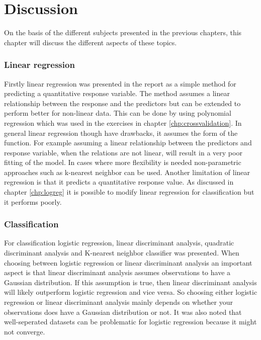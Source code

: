 \chapter{Discussion}
\label{chp:disc}
On the basis of the different subjects presented in the previous chapters, this chapter will discuss the different aspects of these  topics.

\subsection{Linear regression}

Firstly linear regression was presented in the report as a simple method for predicting a quantitative response variable. The method assumes a linear relationship between the response and the predictors but can be extended to perform better for non-linear data. This can be done by using polynomial regression which was used in the exercises in chapter \ref{chp:crossvalidation}. In general linear regression though have drawbacks, it assumes the form of the function. For example assuming a linear relationship between the predictors and response variable, when the relations are not linear, will result in a very poor fitting of the model. In cases where more flexibility is needed non-parametric approaches such as k-nearest neighbor can be used. Another limitation of linear regression is that it predicts a quantitative response value. As discussed in chapter \ref{chp:logreg} it is possible to modify linear regression for classification but it performs poorly.

\subsection{Classification}

For classification logistic regression, linear discriminant analysis, quadratic discriminant analysis and K-nearest neighbor classifier was presented. When choosing between logistic regression or linear discriminant analysis an important aspect is that linear discriminant analysis assumes observations to have a Gaussian distribution. If this assumption is true, then linear discriminant analysis will likely outperform logistic regression and vice versa. So choosing either logistic regression or linear discriminant analysis mainly depends on whether your observations does have a Gaussian distribution or not. It was also noted that well-seperated datasets can be problematic for logistic regression because it might not converge.
 

